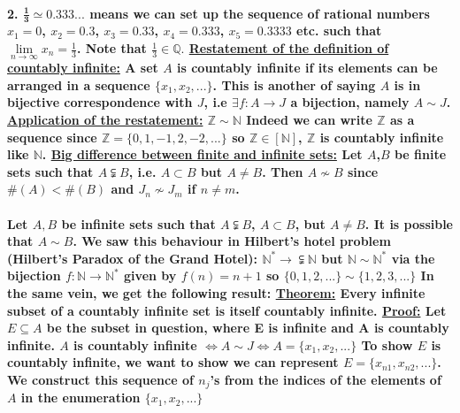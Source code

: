 \documentclass[10pt,a4paper]{article}
\begin{document}
\paragraph{2. $\bm{\frac{1}{3	} \simeq 0.333...}$ means we can set up the sequence of rational numbers $x_{1} = 0$, $x_{2} = 0.3$,  $x_{3} = 0.33$,  $x_{4} = 0.333$,  $x_{5} = 0.3333$ etc. such that $\lim\limits_{n\to\infty} x_{n} = \frac{1}{3}$.\newline 
Note that $\frac{1}{3} \in \mathbb{Q}.$\newline
\underline{Restatement of the definition of countably infinite:} A set $A$ is countably infinite if its elements can be arranged in a sequence $\lbrace x_{1},x_{2},...\rbrace$. This is another of saying $A$ is in bijective correspondence with $J$, i.e $\exists f: A \longrightarrow J$ a bijection, namely $A \sim J$.\newline
\underline{Application of the restatement:} $\mathbb{Z} \sim \mathbb{N}$ \newline
Indeed we can write $\mathbb{Z}$ as a sequence since $\mathbb{Z} = \lbrace 0,1,-1,2,-2,...\rbrace$ so $\mathbb{Z} \in \left[\mathbb{N}\right]$, $\mathbb{Z}$ is countably infinite like $\mathbb{N}$.\newline
\underline{Big difference between finite and infinite sets:}\newline
Let $A$,$B$ be finite sets such that $A\subsetneqq B$, i.e. $A \subset B$ but $A \neq B$. Then $A \nsim B$ since $\#(A) < \#(B)$ and $J_{n} \nsim J_{m}$ if $n \neq m$.\newline \newline }
\newpage
\paragraph{Let $A,B$ be infinite sets such that $A\subsetneqq B$, $A \subset B$, but $A \neq B$.\newline
It is possible that $A \sim B$. We saw this behaviour in Hilbert's hotel problem (Hilbert's Paradox of the Grand Hotel): $\mathbb{N}^{*} \longrightarrow \subsetneqq \mathbb{N}$\newline
 but $\mathbb{N} \sim \mathbb{N}^{*}$ via the bijection $f: \mathbb{N} \longrightarrow \mathbb{N}^{*}$ given by $f(n) = n + 1$ so $\lbrace 0,1,2,...\rbrace \sim \lbrace 1,2,3,...\rbrace$ \newline
In the same vein, we get the following result:\newline
\underline{Theorem:} Every infinite subset of a countably infinite set is itself countably infinite.\newline 
\underline{Proof:} Let $E \subseteq A$ be the subset in question, where E is infinite and A is countably infinite. $A$ is countably infinite $\iff A \sim J \iff A = \lbrace x_{1},x_{2},...\rbrace$\newline
To show $E$ is countably infinite, we want to show we can represent $E = \lbrace x_{n1},x_{n2},...\rbrace$. We construct this sequence of $n_{j}$'s from the indices of the elements of $A$ in the enumeration $\lbrace x_{1},x_{2},...\rbrace$\newline
}
\end{document}
